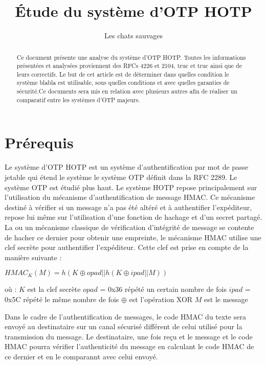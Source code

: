 \documentclass{../res/univ-projet}
\title{\'Etude du syst\`eme d'OTP \og{}HOTP\fg{}}
\author{Les chats sauvages}
\begin{document}
\maketitle

\begin{abstract}
Ce document présente une analyse du système d'OTP \og{}HOTP\fg{}. Toutes les informations présentées et analysées proviennent des RFCs 4226 et 2104, truc et truc ainsi que 
de leurs correctifs. Le but de cet article est de déterminer dans quelles condition le système blabla est utilisable, sous quelles conditions et avec quelles garanties de 
sécurité.Ce documents sera mis en relation avec plusieurs autres afin de réaliser un comparatif entre les systèmes d'OTP majeurs.
\end{abstract}
\newpage
\tableofcontents
\newpage

\section{Prérequis}
Le système d'OTP \og{}HOTP\fg{} est un système d'authentification par mot de passe jetable qui étend le système le système OTP définit dans la RFC 2289. Le système OTP 
est étudié plus haut.
Le système HOTP repose principalement sur l'utilisation du mécanisme d'authentification de message HMAC. Ce mécanisme destiné à vérifier si un message n'a pas été altéré
et à authentifier l'expéditeur, repose lui m\^eme sur l'utilisation d'une fonction de hachage et d'un secret partagé. La ou un mécanisme classique de vérification 
d'intégrité de message se contente de hacher ce dernier pour obtenir une empreinte, le mécanisme HMAC utilise une clef secrète pour authentifier l'expéditeur. Cette clef 
est prise en compte de la manière suivante : 
\begin{center}
$HMAC_K(M) = h(K \oplus opad || h(K \oplus ipad || M))$ 
\end{center}
o\`u :\newline
$K$ est la clef secrète \newline
$opad$ = 0x36 répété un certain nombre de fois \newline
$ipad$ = 0x5C répété le m\^eme nombre de fois \newline
$\oplus$ est l'opération XOR \newline
$M$ est le message \newline


Dans le cadre de l'authentification de messages, le code HMAC du texte sera envoyé au destinataire sur un canal sécurisé différent de celui utilisé pour la transmission
du message. Le destinataire, une fois reçu et le message et le code HMAC pourra vérifier l'authenticité du message en calculant le code HMAC de ce dernier et en le 
comparannt avec celui envoyé.
\end{document}

